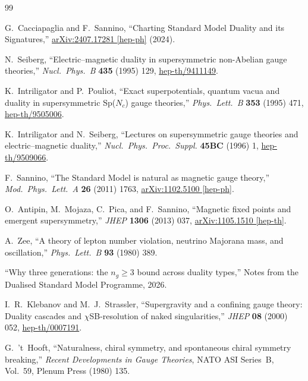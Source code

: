 \documentclass[11pt,a4paper]{article}
\theoremstyle{plain}
\theoremstyle{definition}
\theoremstyle{remark}
\begin{document}
\begin{thebibliography}{99}

  G.~Cacciapaglia and F.~Sannino,
  ``Charting Standard Model Duality and its Signatures,''
  \href{https://arxiv.org/abs/2407.17281}{arXiv:2407.17281 [hep-ph]} (2024).

  N.~Seiberg,
  ``Electric--magnetic duality in supersymmetric non-Abelian gauge theories,''
  \textit{Nucl.\ Phys.\ B} \textbf{435} (1995) 129,
  \href{https://arxiv.org/abs/hep-th/9411149}{hep-th/9411149}.

  K.~Intriligator and P.~Pouliot,
  ``Exact superpotentials, quantum vacua and duality in supersymmetric
  Sp($N_c$) gauge theories,''
  \textit{Phys.\ Lett.\ B} \textbf{353} (1995) 471,
  \href{https://arxiv.org/abs/hep-th/9505006}{hep-th/9505006}.

  K.~Intriligator and N.~Seiberg,
  ``Lectures on supersymmetric gauge theories and electric--magnetic duality,''
  \textit{Nucl.\ Phys.\ Proc.\ Suppl.} \textbf{45BC} (1996) 1,
  \href{https://arxiv.org/abs/hep-th/9509066}{hep-th/9509066}.

  F.~Sannino,
  ``The Standard Model is natural as magnetic gauge theory,''
  \textit{Mod.\ Phys.\ Lett.\ A} \textbf{26} (2011) 1763,
  \href{https://arxiv.org/abs/1102.5100}{arXiv:1102.5100 [hep-ph]}.

  O.~Antipin, M.~Mojaza, C.~Pica, and F.~Sannino,
  ``Magnetic fixed points and emergent supersymmetry,''
  \textit{JHEP} \textbf{1306} (2013) 037,
  \href{https://arxiv.org/abs/1105.1510}{arXiv:1105.1510 [hep-th]}.

  A.~Zee,
  ``A theory of lepton number violation, neutrino Majorana mass, and
  oscillation,''
  \textit{Phys.\ Lett.\ B} \textbf{93} (1980) 389.

  ``Why three generations: the $n_g \geq 3$ bound across duality types,''
  Notes from the Dualised Standard Model Programme, 2026.

  I.~R.~Klebanov and M.~J.~Strassler,
  ``Supergravity and a confining gauge theory:
  Duality cascades and $\chi$SB-resolution of naked singularities,''
  \textit{JHEP} \textbf{08} (2000) 052,
  \href{https://arxiv.org/abs/hep-th/0007191}{hep-th/0007191}.

  G.~'t~Hooft,
  ``Naturalness, chiral symmetry, and spontaneous chiral symmetry breaking,''
  \textit{Recent Developments in Gauge Theories}, NATO ASI Series~B,
  Vol.~59, Plenum Press (1980) 135.

\end{thebibliography}
\end{document}

